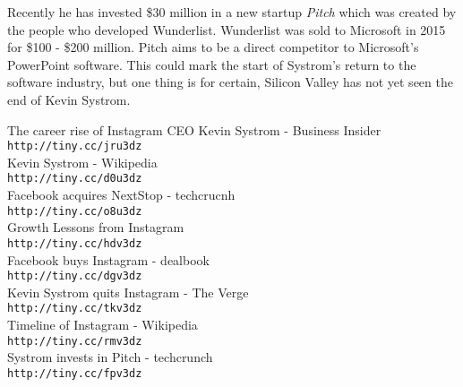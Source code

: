 \documentclass[12pt]{article}
\begin{document}
    Recently he has invested  \$30 million in a new startup \textit{Pitch} which was created by the people who developed Wunderlist.
    Wunderlist was sold to Microsoft in 2015 for \$100 - \$200 million. Pitch aims to be a direct competitor to Microsoft's PowerPoint software.
    This could mark the start of Systrom's return to the software industry, but one thing is for certain, Silicon Valley has not yet seen the end of Kevin Systrom.

    \medskip
 
    \begin{thebibliography}{9}

        The career rise of Instagram CEO Kevin Systrom - Business Insider   
        \\\texttt{http://tiny.cc/jru3dz}
        \\
        Kevin Systrom - Wikipedia        
        \\\texttt{http://tiny.cc/d0u3dz}
        \\
        Facebook acquires NextStop - techcrucnh
        \\\texttt{http://tiny.cc/o8u3dz}
        \\
        Growth Lessons from Instagram        
        \\\texttt{http://tiny.cc/hdv3dz}
        \\
        Facebook buys Instagram - dealbook      
        \\\texttt{http://tiny.cc/dgv3dz}
        \\
        Kevin Systrom quits Instagram - The Verge
        \\\texttt{http://tiny.cc/tkv3dz}
        \\
        Timeline of Instagram - Wikipedia    
        \\\texttt{http://tiny.cc/rmv3dz}
        \\
        Systrom invests in Pitch - techcrunch
        \\\texttt{http://tiny.cc/fpv3dz}
        \\
    \end{thebibliography}
\end{document}
